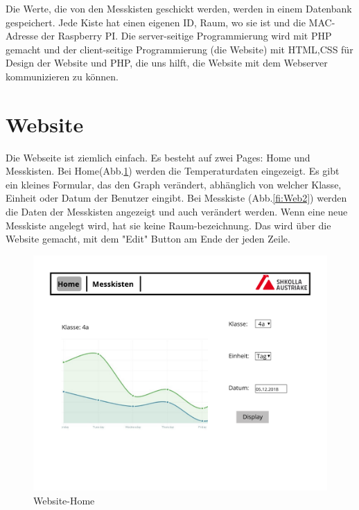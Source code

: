 \pagestyle{fancy}
Die Werte, die von den Messkisten geschickt werden, werden in einem Datenbank gespeichert. Jede Kiste hat einen eigenen ID, Raum, wo sie ist und die MAC-Adresse der Raspberry PI. Die server-seitige Programmierung wird mit PHP gemacht und der client-seitige Programmierung (die Website) mit HTML,CSS f\"ur Design der Website und PHP, die uns hilft, die Website mit dem Webserver kommunizieren zu k\"onnen. 
	\section{Website}
	Die Webseite ist ziemlich einfach. Es besteht auf zwei Pages: Home und Messkisten. 
	Bei Home(Abb.\ref{fi:Web1}) werden die Temperaturdaten eingezeigt. Es gibt ein kleines Formular, das den Graph ver\"andert, abh\"anglich von welcher Klasse, Einheit oder Datum der Benutzer eingibt.	
	Bei Messkiste (Abb.\ref{fi:Web2}) werden die Daten der Messkisten angezeigt und auch ver\"andert werden. Wenn eine neue Messkiste angelegt wird, hat sie keine Raum-bezeichnung. Das wird \"uber die Website gemacht, mit dem "Edit" Button am Ende der jeden Zeile. 
		\begin{figure}[ht]
		\centering
		\includegraphics[scale=0.4]{./bilder/Page_1.png}
		\caption{Website-Home}
		\label{fi:Web1}
		\end{figure} 
